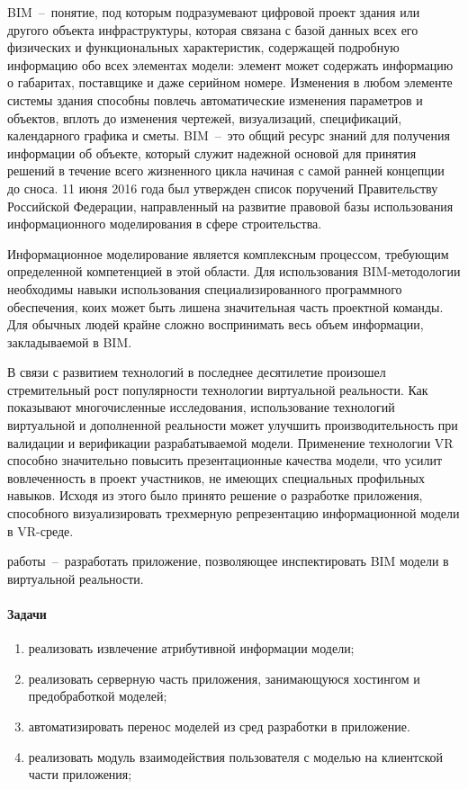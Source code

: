 ﻿
BIM~--~понятие, под которым подразумевают цифровой проект здания или другого объекта инфраструктуры,
которая связана с базой данных всех его физических и функциональных характеристик,
содержащей подробную информацию обо всех элементах модели:
элемент может содержать информацию о габаритах, поставщике и даже серийном номере. 
Изменения в любом элементе системы здания способны повлечь автоматические изменения  параметров и объектов, 
вплоть до изменения чертежей, визуализаций, спецификаций, календарного графика и сметы.
BIM~--~это общий ресурс знаний для получения информации об объекте,
который служит надежной основой для принятия решений в течение всего жизненного цикла
начиная с самой ранней концепции до сноса.
\cite{nationalBIMfaqs}
11 июня 2016 года был утвержден список поручений Правительству Российской Федерации,
направленный на развитие правовой базы использования информационного моделирования в сфере строительства.
\cite{kremlinInstraction2016}

Информационное моделирование является комплексным процессом,
требующим определенной компетенцией в этой области.
Для использования BIM-методологии необходимы навыки использования специализированного программного обеспечения,
коих может быть лишена значительная часть проектной команды.
Для обычных людей крайне сложно воспринимать весь объем информации, закладываемой в BIM.

В связи с развитием технологий в последнее десятилетие
произошел стремительный рост популярности технологии виртуальной реальности.
\cite{Cipresso2018}
Как показывают многочисленные исследования,
использование технологий виртуальной и дополненной реальности может улучшить
производительность при валидации и верификации разрабатываемой модели.
Применение технологии VR способно значительно повысить презентационные качества модели,
что усилит вовлеченность в проект участников,
не имеющих специальных профильных навыков.
\cite{Akpan2018}
Исходя из этого было принято решение о разработке приложения,
способного визуализировать трехмерную репрезентацию информационной модели в VR-среде. 

{ работы}~--~разработать приложение, позволяющее инспектировать BIM модели в виртуальной реальности.

\paragraph{Задачи}
\begin{enumerate}
    \item реализовать извлечение атрибутивной информации модели;
    \item реализовать серверную часть приложения, занимающуюся хостингом и предобработкой моделей;
    \item автоматизировать перенос моделей из сред разработки в приложение.
    \item реализовать модуль взаимодействия пользователя с моделью на клиентской части приложения;
\end{enumerate}